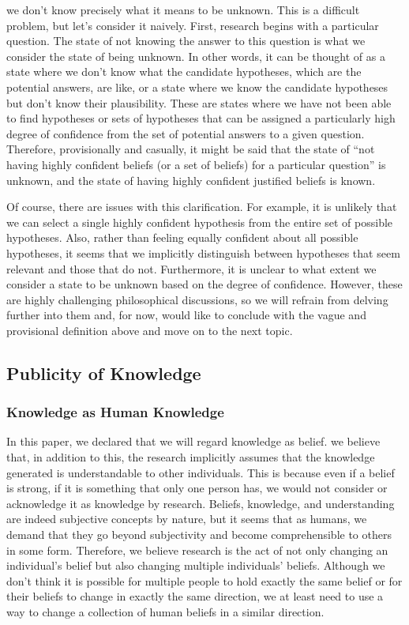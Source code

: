 \documentclass{book}
\begin{document}
we don't know precisely what it means to be unknown. This is a difficult problem, but let's consider it naively. First, research begins with a particular question. The state of not knowing the answer to this question is what we consider the state of being unknown. In other words, it can be thought of as a state where we don't know what the candidate hypotheses, which are the potential answers, are like, or a state where we know the candidate hypotheses but don't know their plausibility. These are states where we have not been able to find hypotheses or sets of hypotheses that can be assigned a particularly high degree of confidence from the set of potential answers to a given question. Therefore, provisionally and casually, it might be said that the state of ``not having highly confident beliefs (or a set of beliefs) for a particular question'' is unknown, and the state of having highly confident justified beliefs is known.

Of course, there are issues with this clarification. For example, it is unlikely that we can select a single highly confident hypothesis from the entire set of possible hypotheses. Also, rather than feeling equally confident about all possible hypotheses, it seems that we implicitly distinguish between hypotheses that seem relevant and those that do not. Furthermore, it is unclear to what extent we consider a state to be unknown based on the degree of confidence. However, these are highly challenging philosophical discussions, so we will refrain from delving further into them and, for now, would like to conclude with the vague and provisional definition above and move on to the next topic.

\subsection{Publicity of Knowledge}
\subsubsection{Knowledge as Human Knowledge}
In this paper, we declared that we will regard knowledge as belief. we believe that, in addition to this, the research implicitly assumes that the knowledge generated is understandable to other individuals. This is because even if a belief is strong, if it is something that only one person has, we would not consider or acknowledge it as knowledge by research. Beliefs, knowledge, and understanding are indeed subjective concepts by nature, but it seems that as humans, we demand that they go beyond subjectivity and become comprehensible to others in some form. Therefore, we believe research is the act of not only changing an individual's belief but also changing multiple individuals' beliefs. Although we don't think it is possible for multiple people to hold exactly the same belief or for their beliefs to change in exactly the same direction, we at least need to use a way to change a collection of human beliefs in a similar direction.
\end{document}
